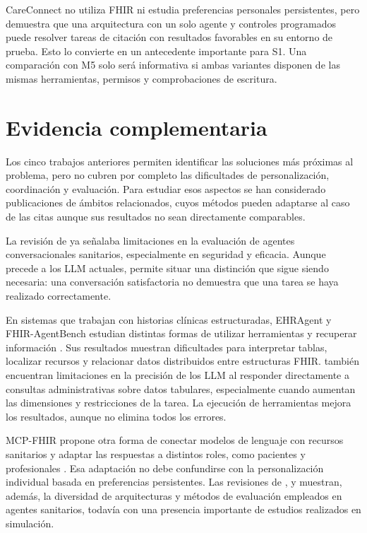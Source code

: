 CareConnect no utiliza FHIR ni estudia preferencias personales persistentes, pero demuestra que una arquitectura con un solo agente y controles programados puede resolver tareas de citación con resultados favorables en su entorno de prueba. Esto lo convierte en un antecedente importante para S1. Una comparación con M5 solo será informativa si ambas variantes disponen de las mismas herramientas, permisos y comprobaciones de escritura.

\section{Evidencia complementaria}

Los cinco trabajos anteriores permiten identificar las soluciones más próximas al problema, pero no cubren por completo las dificultades de personalización, coordinación y evaluación. Para estudiar esos aspectos se han considerado publicaciones de ámbitos relacionados, cuyos métodos pueden adaptarse al caso de las citas aunque sus resultados no sean directamente comparables.

La revisión de \citet{laranjo2018healthcare} ya señalaba limitaciones en la evaluación de agentes conversacionales sanitarios, especialmente en seguridad y eficacia. Aunque precede a los LLM actuales, permite situar una distinción que sigue siendo necesaria: una conversación satisfactoria no demuestra que una tarea se haya realizado correctamente.

En sistemas que trabajan con historias clínicas estructuradas, EHRAgent y FHIR-AgentBench estudian distintas formas de utilizar herramientas y recuperar información \citep{shi2024ehragent,lee2026fhiragentbench}. Sus resultados muestran dificultades para interpretar tablas, localizar recursos y relacionar datos distribuidos entre estructuras FHIR. \citet{klang2026administrators} también encuentran limitaciones en la precisión de los LLM al responder directamente a consultas administrativas sobre datos tabulares, especialmente cuando aumentan las dimensiones y restricciones de la tarea. La ejecución de herramientas mejora los resultados, aunque no elimina todos los errores.

MCP-FHIR propone otra forma de conectar modelos de lenguaje con recursos sanitarios y adaptar las respuestas a distintos roles, como pacientes y profesionales \citep{ehtesham2025mcpfhir}. Esa adaptación no debe confundirse con la personalización individual basada en preferencias persistentes. Las revisiones de \citet{gorenshtein2025review}, \citet{njei2026scoping} y \citet{tong2026agentic} muestran, además, la diversidad de arquitecturas y métodos de evaluación empleados en agentes sanitarios, todavía con una presencia importante de estudios realizados en simulación.

